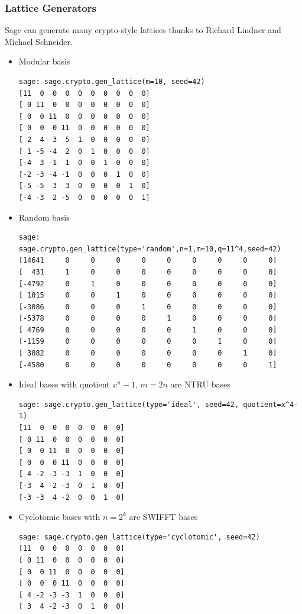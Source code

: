 \documentclass[10pt]{beamer}
\begin{document}
\begin{frame}
\frametitle{Lattice Generators}

Sage can generate many crypto-style lattices thanks to Richard Lindner and Michael Schneider.

\begin{itemize}
 \item Modular basis
\begin{lstlisting}
sage: sage.crypto.gen_lattice(m=10, seed=42)
[11  0  0  0  0  0  0  0  0  0]
[ 0 11  0  0  0  0  0  0  0  0]
[ 0  0 11  0  0  0  0  0  0  0]
[ 0  0  0 11  0  0  0  0  0  0]
[ 2  4  3  5  1  0  0  0  0  0]
[ 1 -5 -4  2  0  1  0  0  0  0]
[-4  3 -1  1  0  0  1  0  0  0]
[-2 -3 -4 -1  0  0  0  1  0  0]
[-5 -5  3  3  0  0  0  0  1  0]
[-4 -3  2 -5  0  0  0  0  0  1]
\end{lstlisting}
\framebreak
\item Random basis
\begin{lstlisting}
sage: sage.crypto.gen_lattice(type='random',n=1,m=10,q=11^4,seed=42)
[14641     0     0     0     0     0     0     0     0     0]
[  431     1     0     0     0     0     0     0     0     0]
[-4792     0     1     0     0     0     0     0     0     0]
[ 1015     0     0     1     0     0     0     0     0     0]
[-3086     0     0     0     1     0     0     0     0     0]
[-5378     0     0     0     0     1     0     0     0     0]
[ 4769     0     0     0     0     0     1     0     0     0]
[-1159     0     0     0     0     0     0     1     0     0]
[ 3082     0     0     0     0     0     0     0     1     0]
[-4580     0     0     0     0     0     0     0     0     1]
\end{lstlisting}
\framebreak
\item Ideal bases with quotient $x^n-1$, $m=2n$ are NTRU bases
\begin{lstlisting}
sage: sage.crypto.gen_lattice(type='ideal', seed=42, quotient=x^4-1)
[11  0  0  0  0  0  0  0]
[ 0 11  0  0  0  0  0  0]
[ 0  0 11  0  0  0  0  0]
[ 0  0  0 11  0  0  0  0]
[ 4 -2 -3 -3  1  0  0  0]
[-3  4 -2 -3  0  1  0  0]
[-3 -3  4 -2  0  0  1  0]
\end{lstlisting}
\framebreak
\item Cyclotomic bases with $n=2^k$ are SWIFFT bases
\begin{lstlisting}
sage: sage.crypto.gen_lattice(type='cyclotomic', seed=42)
[11  0  0  0  0  0  0  0]
[ 0 11  0  0  0  0  0  0]
[ 0  0 11  0  0  0  0  0]
[ 0  0  0 11  0  0  0  0]
[ 4 -2 -3 -3  1  0  0  0]
[ 3  4 -2 -3  0  1  0  0]

\end{lstlisting}
\end{itemize}
\end{frame}
\end{document}
